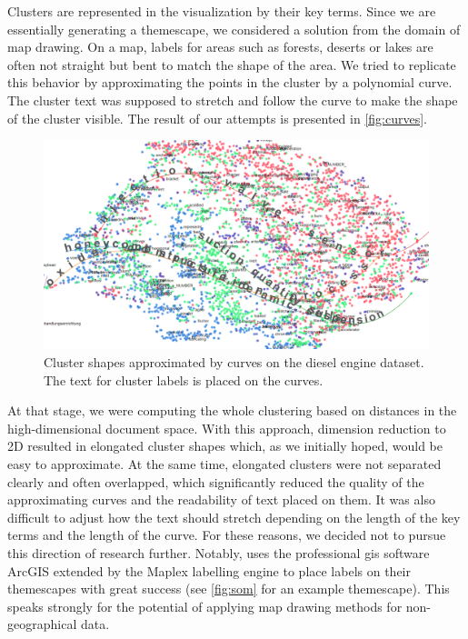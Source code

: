 Clusters are represented in the visualization by their key terms.
Since we are essentially generating a themescape, we considered a solution from the domain of map drawing.
On a map, labels for areas such as forests, deserts or lakes are often not straight but bent to match the shape of the area.
We tried to replicate this behavior by approximating the points in the cluster by a polynomial curve.
The cluster text was supposed to stretch and follow the curve to make the shape of the cluster visible.
The result of our attempts is presented in \autoref{fig:curves}.

\begin{figure}
\centering
\includegraphics[width=\textwidth]{img/curves}
\caption{Cluster shapes approximated by curves on the diesel engine dataset. The text for cluster labels is placed on the curves.}
\label{fig:curves}
\end{figure}

At that stage, we were computing the whole clustering based on distances in the high-dimensional document space.
With this approach, dimension reduction to 2D resulted in elongated cluster shapes which, as we initially hoped, would be easy to approximate.
At the same time, elongated clusters were not separated clearly and often overlapped, which significantly reduced the quality of the approximating curves and the readability of text placed on them.
It was also difficult to adjust how the text should stretch depending on the length of the key terms and the length of the curve.
For these reasons, we decided not to pursue this direction of research further.
Notably, \cite{Skupin2013} uses the professional \gls{gis} software ArcGIS extended by the Maplex labelling engine to place labels on their themescapes with great success (see \autoref{fig:som} for an example themescape).
This speaks strongly for the potential of applying map drawing methods for non-geographical data.

